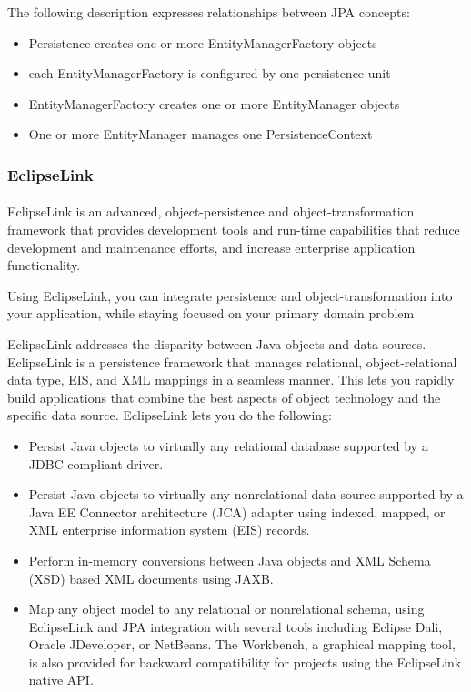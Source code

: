 \begin{itemize}
The following description expresses relationships between JPA concepts:
\begin{itemize}
\item Persistence creates one or more EntityManagerFactory objects
\item each EntityManagerFactory is configured by one persistence unit
\item EntityManagerFactory creates one or more EntityManager objects
\item One or more EntityManager manages one PersistenceContext
\end{itemize}
\end{itemize}
\subsubsection{EclipseLink}
\paragraph{}
EclipseLink is an advanced, object-persistence and object-transformation framework that provides development tools and run-time capabilities that reduce development and maintenance efforts, and increase enterprise application functionality. 

Using EclipseLink, you can integrate persistence and object-transformation into your application, while staying focused on your primary domain problem

EclipseLink addresses the disparity between Java objects and data sources. EclipseLink is a persistence framework that manages relational, object-relational data type, EIS, and XML mappings in a seamless manner. This lets you rapidly build applications that combine the best aspects of object technology and the specific data source. EclipseLink lets you do the following:

\begin{itemize}
\item Persist Java objects to virtually any relational database supported by a JDBC-compliant driver.

\item Persist Java objects to virtually any nonrelational data source supported by a Java EE Connector architecture (JCA) adapter using indexed, mapped, or XML enterprise information system (EIS) records.

\item Perform in-memory conversions between Java objects and XML Schema (XSD) based XML documents using JAXB.

\item Map any object model to any relational or nonrelational schema, using EclipseLink and JPA integration with several tools including Eclipse Dali, Oracle JDeveloper, or NetBeans. The Workbench, a graphical mapping tool, is also provided for backward compatibility for projects using the EclipseLink native API.
\end{itemize}
